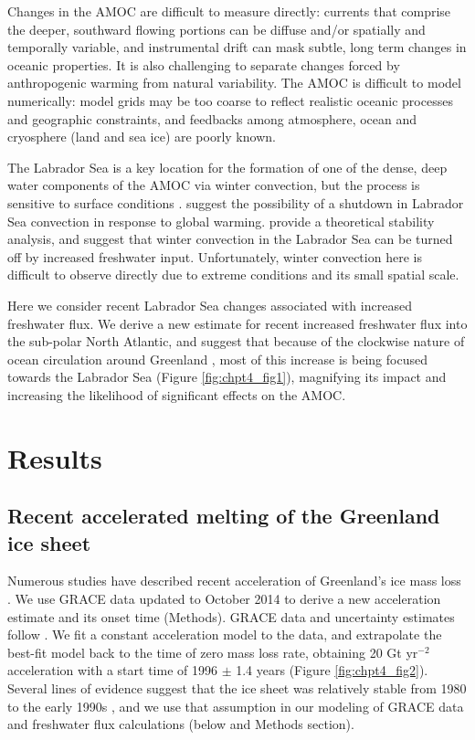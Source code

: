 Changes in the AMOC are difficult to measure directly: currents that comprise the deeper, southward flowing portions can be diffuse and/or spatially and temporally variable, and instrumental drift can mask subtle, long term changes in oceanic properties.  It is also challenging to separate changes forced by anthropogenic warming from natural variability.  The AMOC is difficult to model numerically: model grids may be too coarse to reflect realistic oceanic processes and geographic constraints, and feedbacks among atmosphere, ocean and cryosphere (land and sea ice) are poorly known. 

The Labrador Sea is a key location for the formation of one of the dense, deep water components of the AMOC via winter convection, but the process is sensitive to surface conditions \cite[]{yashayaev2009}.  \citet{wood1999} suggest the possibility of a shutdown in Labrador Sea convection in response to global warming.  \citet{kuhlbrodt2001} provide a theoretical stability analysis, and suggest that winter convection in the Labrador Sea can be turned off by increased freshwater input. Unfortunately, winter convection here is difficult to observe directly due to extreme conditions and its small spatial scale. 

Here we consider recent Labrador Sea changes associated with increased freshwater flux.  We derive a new estimate for recent increased freshwater flux into the sub-polar North Atlantic, and suggest that because of the clockwise nature of ocean circulation around Greenland \cite[]{joyce2007}, most of this increase is being focused towards the Labrador Sea (Figure \ref{fig:chpt4_fig1}), magnifying its impact and increasing the likelihood of significant effects on the AMOC.

\section{Results}
\subsection{Recent accelerated melting of the Greenland ice sheet}
Numerous studies have described recent acceleration of Greenland’s ice mass loss \cite[]{jiang2010,rignot2011,enderlin2014,velicogna2014regional,yang2013}.  We use GRACE data updated to October 2014 to derive a new acceleration estimate and its onset time (Methods).  GRACE data and uncertainty estimates follow \citet{bonin2013}.  We fit a constant acceleration model to the data, and extrapolate the best-fit model back to the time of zero mass loss rate, obtaining 20 Gt yr$^{-2}$ acceleration with a start time of 1996 $\pm$ 1.4 years (Figure \ref{fig:chpt4_fig2}).  Several lines of evidence suggest that the ice sheet was relatively stable from 1980 to the early 1990s \cite[]{howat2011,box2013}, and we use that assumption in our modeling of GRACE data and freshwater flux calculations (below and Methods section). 

